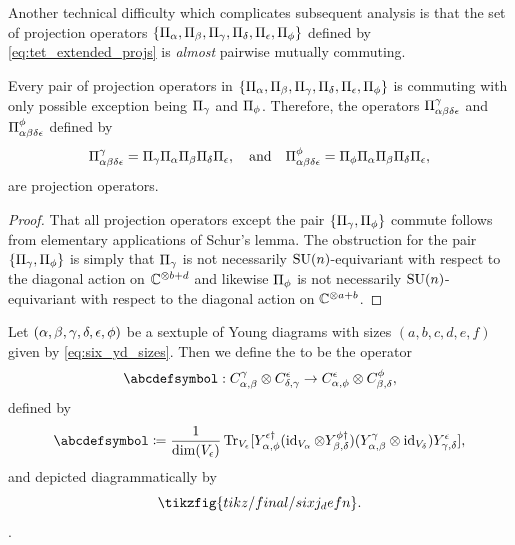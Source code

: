 \documentclass[notitlepage, 10pt]{article}
\begin{document}
Another technical difficulty which complicates subsequent analysis is that the set of projection operators $\{\Pi_{\alpha}, \Pi_{\beta}, \Pi_{\gamma}, \Pi_{\delta}, \Pi_{\epsilon}, \Pi_{\phi}\}$ defined by \cref{eq:tet_extended_projs} is \textit{almost} pairwise mutually commuting.
\begin{lem}
    \label{lem:tet_com_rels}
    Every pair of projection operators in $\{\Pi_{\alpha}, \Pi_{\beta}, \Pi_{\gamma}, \Pi_{\delta}, \Pi_{\epsilon}, \Pi_{\phi}\}$ is commuting with only possible exception being $\Pi_{\gamma}$ and $\Pi_{\phi}$.
    Therefore, the operators $\Pi^{\gamma}_{\alpha\beta\delta\epsilon}$ and $\Pi^{\phi}_{\alpha\beta\delta\epsilon}$ defined by
    \begin{align}
        \label{eq:commuting_extended_projs}
        \begin{split}
            \Pi^{\gamma}_{\alpha\beta\delta\epsilon} = \Pi_{\gamma}\Pi_{\alpha}\Pi_{\beta}\Pi_{\delta}\Pi_{\epsilon}, \quad \text{and} \quad
            \Pi^{\phi}_{\alpha\beta\delta\epsilon} = \Pi_{\phi}\Pi_{\alpha}\Pi_{\beta}\Pi_{\delta}\Pi_{\epsilon},
        \end{split}
    \end{align}
    are projection operators.
\end{lem}
\begin{proof}
    That all projection operators except the pair $\{\Pi_{\gamma}, \Pi_{\phi}\}$ commute follows from elementary applications of Schur's lemma.
    The obstruction for the pair $\{\Pi_{\gamma}, \Pi_{\phi}\}$ is simply that $\Pi_{\gamma}$ is not necessarily $\operatorname{SU}(n)$-equivariant with respect to the diagonal action on $\mathbb C^{\otimes b+d}$ and likewise $\Pi_{\phi}$ is not necessarily $\operatorname{SU}(n)$-equivariant with respect to the diagonal action on $\mathbb C^{\otimes a+b}$.
\end{proof}

\begin{defn}
    \label{defn:sixj}
    Let $(\alpha,\beta,\gamma,\delta,\epsilon,\phi)$ be a sextuple of Young diagrams with sizes $(a,b,c,d,e,f)$ given by \cref{eq:six_yd_sizes}.
    Then we define the  to be the operator\footnotemark{}
    \begin{equation}
        \abcdefsymbol
        :
        C^{\yc}_{\ya,\yb} \ot C^{\ye}_{\yd,\yc} \to C^{\ye}_{\ya, \yf} \ot C^{\yf}_{\yb,\yd},
    \end{equation}
    defined by
    \begin{equation}
        \label{eq:sixj}
        \abcdefsymbol
        \coloneqq
        \frac{1}{\dim(V_{\ye})}
        \Tr_{V_{\ye}}[
        Y_{\ya,\yf}^{\ye\dagger}
        (\id_{V_{\ya}}\ot Y_{\yb,\yd}^{\yf\dagger})
        (Y_{\ya,\yb}^{\yc}\ot\id_{V_{\yd}})
        Y_{\yc,\yd}^{\ye}
        ],
    \end{equation}
    and depicted diagrammatically by
    \begin{equation}
        \tikzfig{tikz/final/sixj_defn}.
    \end{equation}
    .
\end{defn}
\end{document}
